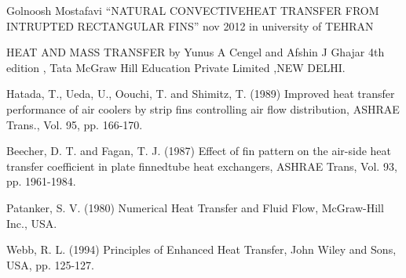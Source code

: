 \clearpage
%






\clearpage
{}
\begin{thebibliography}{99}

Golnoosh Mostafavi “NATURAL CONVECTIVEHEAT TRANSFER FROM INTRUPTED RECTANGULAR FINS” nov 2012 in university of TEHRAN


HEAT AND MASS TRANSFER by Yunus A Cengel and Afshin J Ghajar 4th edition ,
Tata McGraw Hill Education Private Limited ,NEW DELHI.


Hatada, T., Ueda, U., Oouchi, T. and Shimitz, T. (1989) Improved heat transfer performance of air coolers by strip
fins controlling air flow distribution, ASHRAE Trans., Vol. 95, pp. 166-170.

Beecher, D. T. and Fagan, T. J. (1987) Effect of fin pattern on the air-side heat transfer coefficient in plate finnedtube
heat exchangers, ASHRAE Trans, Vol. 93, pp. 1961-1984.

Patanker, S. V. (1980) Numerical Heat Transfer and Fluid Flow, McGraw-Hill Inc., USA.

Webb, R. L. (1994) Principles of Enhanced Heat Transfer, John Wiley and Sons, USA, pp. 125-127.

\end{thebibliography}



